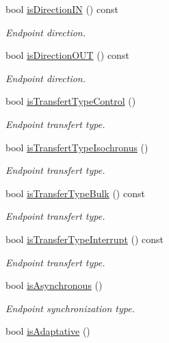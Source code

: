 \begin{DoxyCompactItemize}
bool \hyperlink{classmdt_usb_endpoint_descriptor_adb6022e512f567df1322755390c651ea}{is\-Direction\-I\-N} () const 
\begin{DoxyCompactList}\small\item\em Endpoint direction. \end{DoxyCompactList}\item 
bool \hyperlink{classmdt_usb_endpoint_descriptor_adf79574733279c3f71407149b055f003}{is\-Direction\-O\-U\-T} () const 
\begin{DoxyCompactList}\small\item\em Endpoint direction. \end{DoxyCompactList}\item 
bool \hyperlink{classmdt_usb_endpoint_descriptor_a98313de5a27b8d9f21dd626a03fa9d3f}{is\-Transfert\-Type\-Control} ()
\begin{DoxyCompactList}\small\item\em Endpoint transfert type. \end{DoxyCompactList}\item 
bool \hyperlink{classmdt_usb_endpoint_descriptor_a4e70988edb576768b41a9d2c3093c62e}{is\-Transfert\-Type\-Isochronus} ()
\begin{DoxyCompactList}\small\item\em Endpoint transfert type. \end{DoxyCompactList}\item 
bool \hyperlink{classmdt_usb_endpoint_descriptor_a556d29f75efa88d40c365dd7c88cfb09}{is\-Transfer\-Type\-Bulk} () const 
\begin{DoxyCompactList}\small\item\em Endpoint transfert type. \end{DoxyCompactList}\item 
bool \hyperlink{classmdt_usb_endpoint_descriptor_a5e3930a192da5aae0eb81cda4d8743ca}{is\-Transfer\-Type\-Interrupt} () const 
\begin{DoxyCompactList}\small\item\em Endpoint transfert type. \end{DoxyCompactList}\item 
bool \hyperlink{classmdt_usb_endpoint_descriptor_a9e758fcd2f85d4a41a7a95241585ce29}{is\-Asynchronous} ()
\begin{DoxyCompactList}\small\item\em Endpoint synchronization type. \end{DoxyCompactList}\item 
bool \hyperlink{classmdt_usb_endpoint_descriptor_a4547eeba32592fc49d56c73a53c49584}{is\-Adaptative} ()

\end{DoxyCompactItemize}
